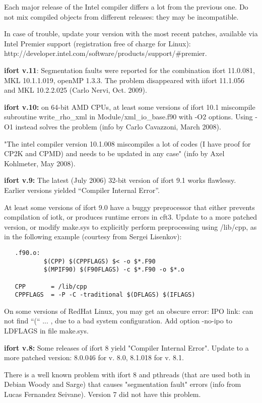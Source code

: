 \documentclass[12pt,a4paper]{article}
\begin{document}
Each major release of the Intel compiler differs a lot from the previous one.
Do not mix compiled objects from different releases: they may be incompatible.
    
In case of trouble, update your version with the most recent patches,
available via Intel Premier support (registration free of charge for Linux):
http://developer.intel.com/software/products/support/\#premier.

{\bf ifort v.11}: Segmentation faults were reported for the combination 
ifort 11.0.081, MKL 10.1.1.019, openMP 1.3.3. The problem disappeared
with iifort 11.1.056 and MKL 10.2.2.025 (Carlo Nervi, Oct. 2009).

{\bf ifort v.10:} on 64-bit AMD CPUs, at least some versions of ifort 10.1 
miscompile subroutine write\_rho\_xml in Module/xml\_io\_base.f90 with -O2
options. Using -O1 instead solves the problem (info by Carlo
Cavazzoni, March 2008). 

"The intel compiler version 10.1.008 miscompiles a lot of codes (I have proof 
for CP2K and CPMD) and needs to be updated in any case" (info by Axel
Kohlmeter, May 2008).
 
{\bf ifort v.9:} The latest (July 2006) 32-bit version of ifort 9.1
works flawlessy. Earlier versions yielded ``Compiler Internal Error''.

At least some versions of ifort 9.0 have a buggy preprocessor that either
prevents compilation of iotk, or produces runtime errors in cft3. Update
to a more patched version, or modify make.sys to explicitly perform 
preprocessing using /lib/cpp, as in the following example (courtesy from Sergei
Lisenkov):
\begin{verbatim}
   .f90.o:
           $(CPP) $(CPPFLAGS) $< -o $*.F90
           $(MPIF90) $(F90FLAGS) -c $*.F90 -o $*.o

   CPP       = /lib/cpp
   CPPFLAGS  = -P -C -traditional $(DFLAGS) $(IFLAGS)
\end{verbatim}
    
On some versions of RedHat Linux, you may get an obscure error: IPO
link: can not find ``(`` ... , due to a bad system configuration. Add
option -no-ipo to LDFLAGS in file make.sys.

{\bf ifort v.8:} Some releases of ifort 8 yield "Compiler Internal
Error". Update to a more patched version: 8.0.046 for v. 8.0, 8.1.018
for v. 8.1. 

There is a well known problem with ifort 8 and pthreads (that are used
both in Debian Woody and Sarge) that causes "segmentation fault" errors
(info from Lucas Fernandez Seivane). Version 7 did not have this problem.
\end{document}
